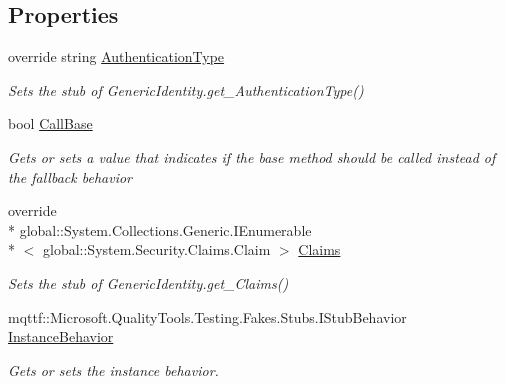 \subsection*{Properties}
\begin{DoxyCompactItemize}
\item 
override string \hyperlink{class_system_1_1_security_1_1_principal_1_1_fakes_1_1_stub_generic_identity_a49cc2df850e9687c8c3057c3b3f801b0}{Authentication\-Type}
\begin{DoxyCompactList}\small\item\em Sets the stub of Generic\-Identity.\-get\-\_\-\-Authentication\-Type()\end{DoxyCompactList}\item 
bool \hyperlink{class_system_1_1_security_1_1_principal_1_1_fakes_1_1_stub_generic_identity_aa43e15de09d92b50c24d857101bbc1ee}{Call\-Base}
\begin{DoxyCompactList}\small\item\em Gets or sets a value that indicates if the base method should be called instead of the fallback behavior\end{DoxyCompactList}\item 
override \\*
global\-::\-System.\-Collections.\-Generic.\-I\-Enumerable\\*
$<$ global\-::\-System.\-Security.\-Claims.\-Claim $>$ \hyperlink{class_system_1_1_security_1_1_principal_1_1_fakes_1_1_stub_generic_identity_af57442c4c90145f8bf45833aac59521d}{Claims}
\begin{DoxyCompactList}\small\item\em Sets the stub of Generic\-Identity.\-get\-\_\-\-Claims()\end{DoxyCompactList}\item 
mqttf\-::\-Microsoft.\-Quality\-Tools.\-Testing.\-Fakes.\-Stubs.\-I\-Stub\-Behavior \hyperlink{class_system_1_1_security_1_1_principal_1_1_fakes_1_1_stub_generic_identity_aebfe31f6715669121785a6d5a100efd6}{Instance\-Behavior}
\begin{DoxyCompactList}\small\item\em Gets or sets the instance behavior.\end{DoxyCompactList}\item 

\end{DoxyCompactItemize}
